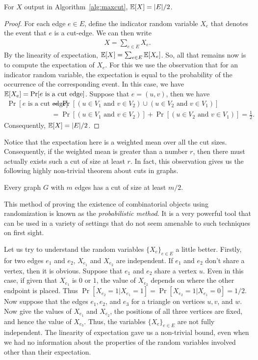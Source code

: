 \begin{lemma}
	For $X$ output in Algorithm~\ref{alg:maxcut}, $\mathbb{E}[X] = |E|/2$.
	\label{lem:size-maxcut}
\end{lemma}
\begin{proof}
	For each edge $e\in E$, define the indicator random variable $X_e$ that denotes the event that $e$ is a cut-edge. We can then write 
	\begin{align*}
		X = \sum_{e\in E} X_e.
	\end{align*}
	By the linearity of expectation, $\mathbb{E}[X] = \sum_{e\in E} \mathbb{E}[X_e]$. So, all that remains now is to compute the expectation of $X_e$. For this we use the observation that for an indicator random variable, the expectation is equal to the probability of the occurrence of the corresponding event. In this case, we have $\mathbb{E}[X_e] = \Pr[\text{$e$ is a cut edge}]$. Suppose that $e=(u,v)$, then we have
	\begin{align*}
		\Pr[\text{$e$ is a cut edge}] &= \Pr[(u \in V_1 \text{ and } v\in V_2) \cup (u \in V_2 \text{ and } v\in V_1)]\\
		&= \Pr[(u \in V_1 \text{ and } v\in V_2)] + \Pr[(u \in V_2 \text{ and } v\in V_1)] = \frac{1}{2}.
	\end{align*}
	Consequently, $\mathbb{E}[X] = |E|/2$.
\end{proof}

Notice that the expectation here is a weighted mean over all the cut sizes. Consequently, if the weighted mean is greater than a number $r$, then there must actually exists such a cut of size at least $r$. In fact, this observation gives us the following highly non-trivial theorem about cuts in graphs.

\begin{theorem}
	Every graph $G$ with $m$ edges has a cut of size at least $m/2$.
	\label{thm:maxcut}
\end{theorem}

This method of proving the existence of combinatorial objects using randomization is known as the \emph{probabilistic method}. It is a very powerful tool that can be used in a variety of settings that do not seem amenable to such techniques on first sight.

Let us try to understand the random variables $\{X_e\}_{e\in E}$ a little better. Firstly, for two edges $e_1$ and $e_2$, $X_{e_1}$ and $X_{e_2}$ are independent. If $e_1$ and $e_2$ don't share a vertex, then it is obvious. Suppose that $e_1$ and $e_2$ share a vertex $u$. Even in this case, if given that $X_{e_1}$ is $0$ or $1$, the value of $X_{e_2}$ depends on where the other endpoint is placed. Thus $\Pr[X_{e_2}=1 | X_{e_1}=1] = \Pr[X_{e_2}=1 | X_{e_1}=0] = 1/2$. Now suppose that the edges $e_1, e_2$, and $e_3$ for a triangle on vertices $u,v$, and $w$. Now give the values of $X_{e_1}$ and $X_{e_2}$, the positions of all three vertices are fixed, and hence the value of $X_{e_3}$. Thus, the variables $\{X_e\}_{e\in E}$ are not fully independent. The linearity of expectation gave us a non-trivial bound, even when we had no information about the properties of the random variables involved other than their expectation.

